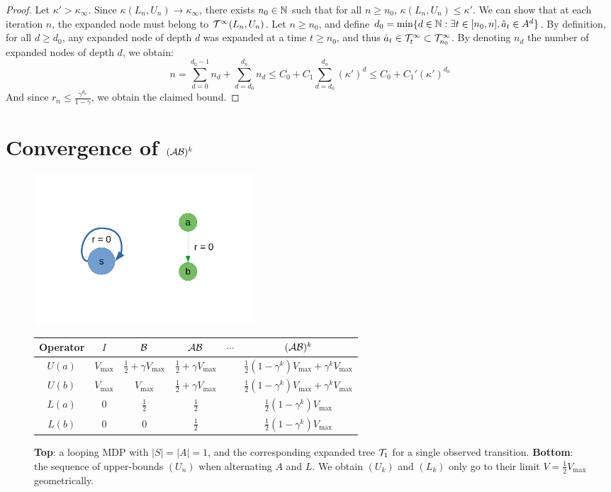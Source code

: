 \documentclass{article}
\begin{document}
\begin{proof}
Let $\kappa'>\kappa_\infty$. Since $\kappa(L_n,U_n)\rightarrow\kappa_\infty$, there exists $n_0\in\mathbb{N}$ such that for all $n\geq n_0$, $\kappa(L_n,U_n) \leq \kappa'$.
We can show that at each iteration $n$, the expanded node must belong to $\mathcal{T}^\infty(L_n,U_n)$.
Let $n\geq n_0$, and define $d_0 = \min\{d\in\mathbb{N}: \exists t \in[n_0,n], \hat{a}_t\in A^d \}$. By definition, for all $d\geq d_0$, any expanded node of depth $d$ was expanded at a time $t\geq n_0$, and thus $\hat{a}_t\in\mathcal{T}^\infty_t \subset\mathcal{T}^\infty_{n_0}$. By denoting $n_d$ the number of expanded nodes of depth $d$, we obtain:
\[
n = \sum_{d=0}^{d_0-1}n_d + \sum_{d=d_0}^{d_n} n_d \leq  C_0 + C_1\sum_{d=d_0}^{d_n} (\kappa')^d \leq C_0 + C_1' (\kappa')^{d_n}
\]
And since $r_n \leq \frac{\gamma^{d_n}}{1-\gamma}$, we obtain the claimed bound.
\end{proof}

\section{Convergence of $(\mathcal{A}\mathcal{B})^k$}
\label{sec:convergence}
\begin{figure}[H]
    \centering
    \includegraphics[trim=2cm 2cm 2cm 2cm, clip, width=0.4\textwidth]{img/simple_loop.pdf}\\
    \begin{tabular}{cccccc}
         \toprule
         Operator & $I$ & $\mathcal{B}$ & $\mathcal{A}\mathcal{B}$ & $\cdots$ & $(\mathcal{A}\mathcal{B})^k$ \\
         \midrule
         $U(a)$ & $V_{\max}$ & $\frac{1}{2} + \gamma V_{\max}$ & $\frac{1}{2} + \gamma V_{\max}$ && $\frac{1}{2}(1-\gamma^k)V_{\max} + \gamma^k V_{\max}$\\
         $U(b)$ & $V_{\max}$ & $V_{\max}$ & $\frac{1}{2} + \gamma V_{\max}$ && $\frac{1}{2}(1-\gamma^k)V_{\max} + \gamma^k V_{\max}$\\
         $L(a)$ & $0$ & $\frac{1}{2}$ & $\frac{1}{2}$ && $\frac{1}{2}(1-\gamma^k)V_{\max}$\\
		 $L(b)$ & $0$ & $0$ & $\frac{1}{2}$ && $\frac{1}{2}(1-\gamma^k)V_{\max}$\\
         \bottomrule
    \end{tabular}
    \caption{\textbf{Top}: a looping MDP with $|S|=|A|=1$, and the corresponding expanded tree $\mathcal{T}_1$ for a single observed transition. \textbf{Bottom}: the sequence of upper-bounds $(U_n)$ when alternating $A$ and $L$. We obtain $(U_k)$ and $(L_k)$ only go to their limit $V = \frac{1}{2}V_{\max}$ geometrically.}
    \label{fig:simple_loop}
\end{figure}
\end{document}
